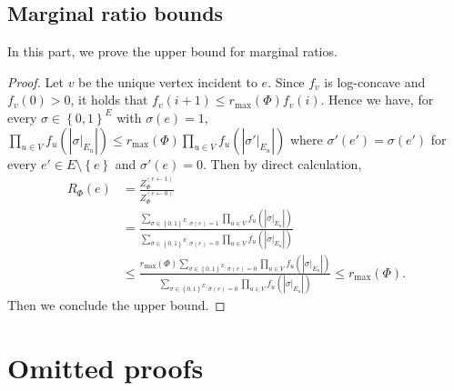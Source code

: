 \documentclass[11pt]{article}
\newcommand{\abs}[1]{\left\vert#1\right\vert}
\newcommand{\set}[1]{\left\{#1\right\}}
\begin{document}
\subsection{Marginal ratio bounds}

In this part, we prove the upper bound for marginal ratios.

\MarginalRatioBound*
\begin{proof}
    Let $v$ be the unique vertex incident to $e$. Since $f_v$ is log-concave and $f_v(0) > 0$, it holds that $f_v(i + 1) \le r_{\max}(\Phi) f_v(i)$. Hence we have, for every $\sigma \in \set{0, 1}^E$ with $\sigma(e) = 1$, $\prod_{u \in V} f_u\left(\abs{\sigma \vert_{E_u}}\right) \le r_{\max}(\Phi) \prod_{u \in V} f_u\left(\abs{\sigma' \vert_{E_u}}\right)$ where $\sigma'(e') = \sigma(e')$ for every $e' \in E \setminus \set{e}$ and $\sigma'(e) = 0$. Then by direct calculation,
    \begin{align*}
        R_{\Phi}(e) &= \frac{Z_{\Phi}^{(e \gets 1)}}{Z_{\Phi}^{(e \gets 0)}} \\
        &= \frac{\sum_{\sigma \in \set{0, 1}^E : \sigma(e) = 1} \prod_{u \in V} f_u\left(\abs{\sigma \vert_{E_u}}\right)}{\sum_{\sigma \in \set{0, 1}^E : \sigma(e) = 0} \prod_{u \in V} f_u\left(\abs{\sigma \vert_{E_u}}\right)} \\
        &\le \frac{r_{\max}(\Phi) \sum_{\sigma \in \set{0, 1}^E : \sigma(e) = 0} \prod_{u \in V} f_u\left(\abs{\sigma \vert_{E_u}}\right)}{\sum_{\sigma \in \set{0, 1}^E : \sigma(e) = 0} \prod_{u \in V} f_u\left(\abs{\sigma \vert_{E_u}}\right)} \le r_{\max}(\Phi).
    \end{align*}
    Then we conclude the upper bound.
\end{proof}

\section{Omitted proofs}\label{sec:omitted Proofs}
\end{document}
